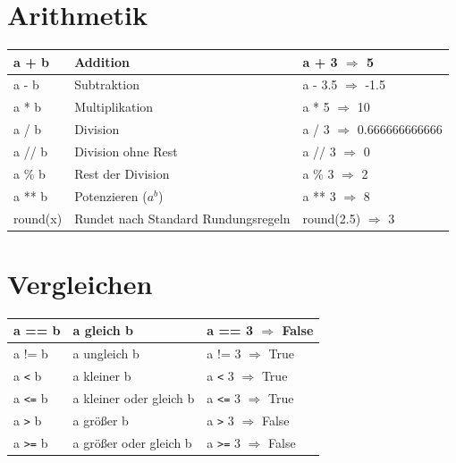 \documentclass[a4paper,12pt]{article}
\begin{document}
\section*{Arithmetik}

\begin{center}
\begin{tabular}{|p{3cm}|p{8cm}|p{3cm}|}
\hline
a + b & Addition & a + 3 \newline{} $\Rightarrow$ 5 \\
\hline
a - b & Subtraktion & a - 3.5 \newline{} $\Rightarrow$ -1.5 \\
\hline
a * b & Multiplikation & a * 5 \newline{} $\Rightarrow$ 10 \\
\hline
a / b & Division & a / 3 \newline{} $\Rightarrow$ 0.666666666666 \\ 
\hline
a // b & Division ohne Rest & a // 3 \newline{} $\Rightarrow$ 0 \\
\hline
a \% b & Rest der Division & a \% 3 \newline{} $\Rightarrow$ 2 \\
\hline
a ** b & Potenzieren ($a^b$) & a ** 3 \newline{} $\Rightarrow$ 8 \\
\hline
round(x) & Rundet nach Standard Rundungsregeln & round(2.5) \newline{} $\Rightarrow$ 3 \\
\hline
\end{tabular}
\end{center}

\section*{Vergleichen}

\begin{center}
\begin{tabular}{|p{3cm}|p{8cm}|p{3cm}|}
\hline
a == b & a gleich b & a == 3 \newline{} $\Rightarrow$ False \\
\hline
a != b & a ungleich b & a != 3 \newline{} $\Rightarrow$ True \\
\hline
a \texttt{<} b & a kleiner b & a \texttt{<} 3 \newline{} $\Rightarrow$ True \\
\hline
a \texttt{<=} b & a kleiner oder gleich b & a \texttt{<=} 3 \newline{} $\Rightarrow$ True \\
\hline
a \texttt{>} b & a größer b & a \texttt{>} 3 \newline{} $\Rightarrow$ False \\
\hline
a \texttt{>=} b & a größer oder gleich b & a \texttt{>=} 3 \newline{} $\Rightarrow$ False \\
\hline
\end{tabular}
\end{center}
\end{document}

